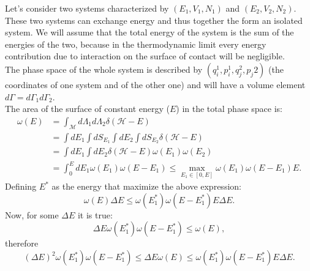 Let's consider two systems characterized by $(E_1,V_1,N_1)$ and $(E_2,V_2,N_2)$. These two systems can exchange energy and thus together the form an isolated system. We will assume that the total energy of the system is the sum of the energies of the two, because in the thermodynamic limit every energy contribution due to interaction on the surface of contact will be negligible.\\The phase space of the whole system is described by $(q_i^1,p_i^1,q_j^2,p_j2)$ (the coordinates of one system and of the other one) and will have a volume element $d\Gamma=d\Gamma_1d\Gamma_2$.\\
The area of the surface of constant energy ($E$) in the total phase space is:
\begin{align*}
    \omega(E)&=\int_{\mathcal{M} }d\Lambda_1d\Lambda_2\delta(\mathcal{H}-E)\\&=\int dE_1\int dS_{E_1}\int dE_2\int dS_{E_2}\delta(\mathcal{H}-E)\\&=\int dE_1\int dE_2\delta(\mathcal{H}-E)\omega(E_1)\omega(E_2)\\&=\int_0^{E} dE_1\omega(E_1)\omega(E-E_1)\leq\max_{E_1\in[0,E]}\omega(E_1)\omega(E-E_1)E.
\end{align*}
Defining $E^*$ as the energy that maximize the above expression:
\begin{equation*}
    \omega(E)\Delta E\leq\omega(E_1^*)\omega(E-E_1^*)E\Delta E.
\end{equation*}
Now, for some $\Delta E$ it is true:
\begin{equation*}
    \Delta E \omega(E_1^*)\omega(E-E_1^*)\leq\omega(E),
\end{equation*}
therefore
\begin{equation*}
    (\Delta E)^2 \omega(E_1^*)\omega(E-E_1^*)\leq\Delta E\omega(E)\leq\omega(E_1^*)\omega(E-E_1^*)E\Delta E.
\end{equation*}
